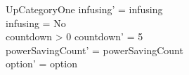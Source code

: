 \begin{schema}{UpCategoryOne}
	infusing' = infusing\\
	infusing = No\\
	countdown > 0 \land countdown' = 5\\
	powerSavingCount' = powerSavingCount\\ option' = option\\
\end{schema}

